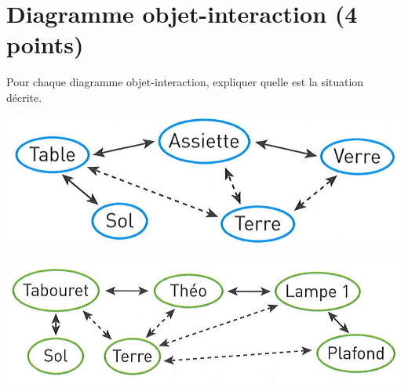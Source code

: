 \section{Diagramme objet-interaction (4 points)}\label{doi}

Pour chaque diagramme objet-interaction, expliquer quelle est la situation décrite.

\begin{multicols}{2}
	\begin{questions}
		\question	\includegraphics[scale=0.38]{doi1}
		
		\question \includegraphics[scale=0.38]{doi2}
		
	\end{questions}
\end{multicols}